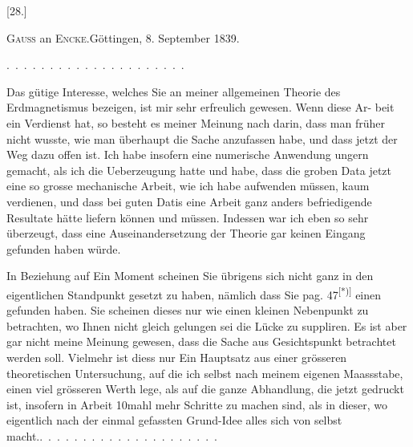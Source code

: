 \clearpage\begingroup{}
\begin{center}[28.]\end{center}
\begin{center}\textsc{Gauss} an \textsc{Encke}.\quad Göttingen, 8. September 1839.\end{center}
\noindent .\ .\ .\ .\ .\ .\ .\ .\ .\ .\ .\ .\ .\ .\ .\ .\ .\ .\ .\ .\ .\par
\indent Das gütige Interesse, welches Sie an meiner allgemeinen Theorie des
Erdmagnetismus bezeigen, ist mir sehr erfreulich gewesen. Wenn diese Ar-
\clearpage{}\HistoricalFoot{}{}
\noindent beit ein Verdienst hat, so besteht es meiner Meinung nach darin, dass man
früher nicht wusste, wie man überhaupt die Sache anzufassen habe, und dass
jetzt der Weg dazu offen ist. Ich habe insofern eine numerische Anwendung
ungern gemacht, als ich die Ueberzeugung hatte und habe, dass die groben
Data jetzt eine so grosse mechanische Arbeit, wie ich habe aufwenden müssen,
kaum verdienen, und dass bei guten Datis eine  Arbeit ganz
anders befriedigende Resultate hätte liefern können und müssen. Indessen
war ich eben so sehr überzeugt, dass eine  Auseinandersetzung der
Theorie gar keinen Eingang gefunden haben würde.

In Beziehung auf Ein Moment scheinen Sie übrigens sich nicht ganz in
den eigentlichen Standpunkt gesetzt zu haben, nämlich dass Sie pag. 47\textsuperscript{[*)]} einen
 gefunden haben. Sie scheinen dieses nur wie einen kleinen Nebenpunkt
zu betrachten, wo Ihnen nicht gleich gelungen sei die Lücke zu suppliren.
Es ist aber gar nicht meine Meinung gewesen, dass die Sache aus
 Gesichtspunkt betrachtet werden soll. Vielmehr ist diess nur Ein
Hauptsatz aus einer grösseren theoretischen Untersuchung, auf die ich selbst
nach meinem eigenen Maassstabe, einen viel grösseren Werth lege, als auf
die ganze Abhandlung, die jetzt gedruckt ist, insofern in  Arbeit 10mahl
mehr  Schritte zu machen sind, als
in dieser, wo eigentlich nach der einmal gefassten Grund-Idee alles sich von
selbst macht.\quad .\ .\ .\ .\ .\ .\ .\ .\ .\ .\ .\ .\ .\ .\ .\ .\ .\ .\ .\ .\ .
\begingroup\renewcommand{\thefootnote}{}\endgroup
\clearpage\endgroup
